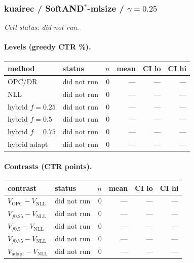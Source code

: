 \documentclass[10pt,a4paper]{article}
\begin{document}
\subsubsection{kuairec / SoftAND$^*$-mlsize / $\gamma=0.25$}
\emph{Cell status: did not run}.
\paragraph{Levels (greedy CTR \%).}
{\centering\small\begin{tabular}{llrrrr}
\toprule method & status & $n$ & mean & CI lo & CI hi \\
\midrule
OPC/DR & did not run & 0 & --- & --- & --- \\
NLL & did not run & 0 & --- & --- & --- \\
hybrid $f{=}0.25$ & did not run & 0 & --- & --- & --- \\
hybrid $f{=}0.5$ & did not run & 0 & --- & --- & --- \\
hybrid $f{=}0.75$ & did not run & 0 & --- & --- & --- \\
hybrid adapt & did not run & 0 & --- & --- & --- \\
\bottomrule\end{tabular}\par}
\paragraph{Contrasts (CTR points).}
{\centering\small\begin{tabular}{llrrrr}
\toprule contrast & status & $n$ & mean & CI lo & CI hi \\
\midrule
$V_{\mathrm{OPC}}-V_{\mathrm{NLL}}$ & did not run & 0 & --- & --- & --- \\
$V_{f0.25}-V_{\mathrm{NLL}}$ & did not run & 0 & --- & --- & --- \\
$V_{f0.5}-V_{\mathrm{NLL}}$ & did not run & 0 & --- & --- & --- \\
$V_{f0.75}-V_{\mathrm{NLL}}$ & did not run & 0 & --- & --- & --- \\
$V_{\mathrm{adapt}}-V_{\mathrm{NLL}}$ & did not run & 0 & --- & --- & --- \\
\bottomrule\end{tabular}\par}
\end{document}
